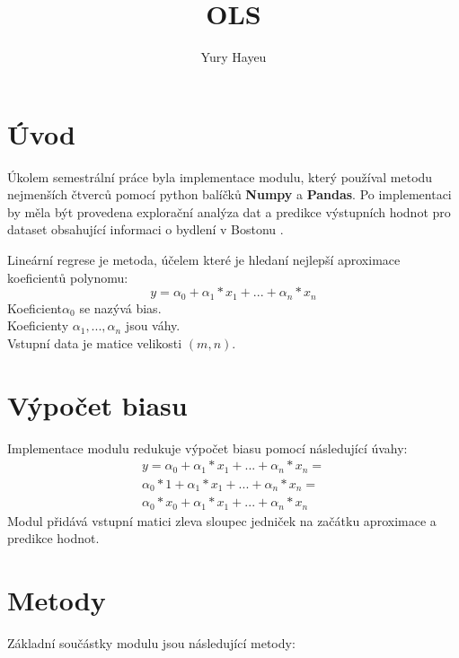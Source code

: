 \documentclass[czech]{pyt-report}
\title{OLS}
\author{Yury Hayeu}
\affiliation{ČVUT--FIT}
\begin{document}
\maketitle


\section{Úvod}
Úkolem semestrální práce byla implementace modulu, který používal metodu nejmenších čtverců pomocí python balíčků \textbf{Numpy} a \textbf{Pandas}.
Po implementaci by měla být provedena explorační analýza dat a predikce výstupních hodnot pro dataset obsahující informaci o bydlení v Bostonu \cite{housing}.

Lineární regrese je metoda, účelem které je hledaní nejlepší aproximace koeficientů polynomu:
\begin{equation}
y = \alpha_0 + \alpha_1 * x_1 + ... + \alpha_n * x_n
\end{equation}
Koeficient$\alpha_0$ se nazývá bias.\\
 Koeficienty $\alpha_1 , ... , \alpha_n$ jsou váhy. \\
 Vstupní data je matice velikosti $(m, n)$.
\section{Výpočet biasu}
Implementace modulu redukuje výpočet biasu pomocí následující úvahy:
\begin{multline*}
y = \alpha_0 + \alpha_1 * x_1 + ... + \alpha_n * x_n =\\
  \alpha_0 * 1 + \alpha_1 * x_1 + ... + \alpha_n * x_n = \\
  \alpha_0 * x_0 + \alpha_1 * x_1 + ... + \alpha_n * x_n
\end{multline*}
Modul přidává vstupní matici zleva sloupec jedniček na začátku aproximace a predikce hodnot.
\section{Metody}
Základní součástky modulu jsou následující metody:
\end{document}

